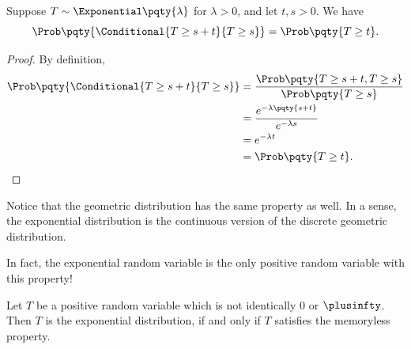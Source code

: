 \begin{proposition}
    \label{prop:memoryless-property-exponential}%
    Suppose \(T \sim \Exponential\pqty{\lambda}\) for \(\lambda > 0\), and let \(t, s > 0\). We have
    \[
        \Prob\pqty{\Conditional{T \geq s + t}{T \geq s}} = \Prob\pqty{T \geq t}.
    \]
\end{proposition}

\begin{proof}
    By definition,
    \begin{align*}
        \Prob\pqty{\Conditional{T \geq s + t}{T \geq s}} &= \frac{\Prob\pqty{T \geq s + t, T \geq s}}{\Prob\pqty{T \geq s}} \\
        &= \frac{e^{-\lambda \pqty{s + t}}}{e^{-\lambda s}} \\
        &= e^{-\lambda t} \\
        &= \Prob\pqty{T \geq t}.
    \end{align*}
\end{proof}

Notice that the geometric distribution has the same property as well. In a sense, the exponential distribution is the continuous version of the discrete geometric distribution.

In fact, the exponential random variable is the only positive random variable with this property!

\begin{theorem}
    \label{thm:memoryless-rv-is-exponential}%
    Let \(T\) be a positive random variable which is not identically \(0\) or \(\plusinfty\). Then \(T\) is the exponential distribution, if and only if \(T\) satisfies the memoryless property.
\end{theorem}

